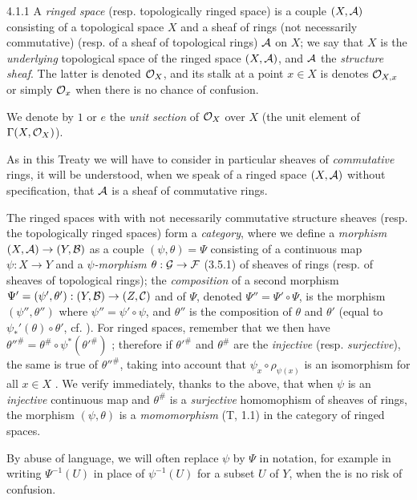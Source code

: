 \documentclass[../main.tex]{subfiles}
\begin{document}
\begin{env}{4.1.1}
A \emph{ringed space} (resp. topologically ringed space) is a couple $(X,\mathcal{A})$
consisting of a topological space $X$ and a sheaf of rings (not necessarily commutative)
(resp. of a sheaf of topological rings) $\mathcal{A}$ on $X$; we say that $X$ is the
\emph{underlying} topological space of the ringed space $(X,\mathcal{A})$, and $\mathcal{A}$
the \emph{structure sheaf}. The latter is denoted $\mathcal{O}_X$, and its stalk at a point
$x\in X$ is denotes $\mathcal{O}_{X,x}$ or simply $\mathcal{O}_x$ when there is no chance of confusion.

We denote by $1$ or $e$ the \emph{unit section} of $\mathcal{O}_X$ over $X$ (the unit element
of $\Gamma(X,\mathcal{O}_X)$).

As in this Treaty we will have to consider in particular sheaves of \emph{commutative}
rings, it will be understood, when we speak of a ringed space $(X,\mathcal{A})$ without
specification, that $\mathcal{A}$ is a sheaf of commutative rings.

The ringed spaces with with not necessarily commutative structure sheaves
(resp. the topologically ringed spaces) form a \emph{category}, where we define
a \emph{morphism} $(X,\mathcal{A})\to(Y,\mathcal{B})$ as a couple $(\psi,\theta)=\Psi$
consisting of a continuous map $\psi:X\to Y$ and a \emph{$\psi$-morphism}
$\theta:\mathcal{G}\to\mathcal{F}$ (3.5.1) of sheaves of rings (resp. of sheaves of
topological rings); the \emph{composition} of a second morphism
$\Psi'=(\psi',\theta'):(Y,\mathcal{B})\to(Z,\mathcal{C})$ and of $\Psi$, denoted
$\Psi''=\Psi'\circ\Psi$, is the morphism $(\psi'',\theta'')$ where $\psi''=\psi'\circ\psi$,
and $\theta''$ is the composition of $\theta$ and $\theta'$ (equal to
$\psi_\ast'(\theta)\circ\theta'$, cf. ). For ringed spaces, remember that we
then have ${\theta''}^\#=\theta^\#\circ\psi^\ast({\theta'}^\#)$ ; therefore
if ${\theta'}^\#$ and $\theta^\#$ are the \emph{injective} (resp. \emph{surjective}),
the same is true of ${\theta''}^\#$, taking into account that $\psi_x\circ\rho_{\psi(x)}$
is an isomorphism for all $x\in X$ . We verify immediately, thanks to the
above, that when $\psi$ is an \emph{injective} continuous map and $\theta^\#$ is
a \emph{surjective} homomophism of sheaves of rings, the morphism $(\psi,\theta)$ is
a \emph{momomorphism} (T, 1.1) in the category of ringed spaces.

By abuse of language, we will often replace $\psi$ by $\Psi$ in notation, for
example in writing $\Psi^{-1}(U)$ in place of $\psi^{-1}(U)$ for a subset $U$ of $Y$,
when the is no risk of confusion.
\end{env}
\end{document}
